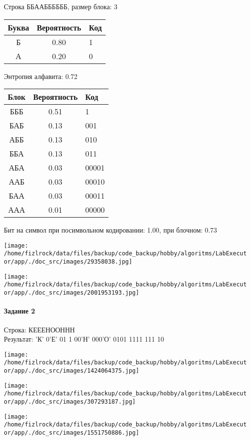 \documentclass[a4paper, 12pt]{article}
\begin{document}
Строка ББААББББББ, размер блока: 3
\begin{center}
 \begin{tabular}{ |c|c|l| } 
  \hline
     Буква & Вероятность & Код\\ \hline
Б & 0.80 & 1\\\hline
А & 0.20 & 0
\\ \hline \end{tabular}
\end{center}
Энтропия алфавита: 0.72
\begin{center}
 \begin{tabular}{ |c|c|l| } 
  \hline
     Блок & Вероятность & Код\\ \hline
БББ & 0.51 & 1\\\hline
БАБ & 0.13 & 001\\\hline
АББ & 0.13 & 010\\\hline
ББА & 0.13 & 011\\\hline
АБА & 0.03 & 00001\\\hline
ААБ & 0.03 & 00010\\\hline
БАА & 0.03 & 00011\\\hline
ААА & 0.01 & 00000
\\ \hline \end{tabular}
\end{center}
Бит на символ при посимвольном кодировании: 1.00, при блочном: 0.73

\texttt{[image: /home/fizlrock/data/files/backup/code\_backup/hobby/algoritms/LabExecutor/app/./doc\_src/images/29358038.jpg]}

\texttt{[image: /home/fizlrock/data/files/backup/code\_backup/hobby/algoritms/LabExecutor/app/./doc\_src/images/2001953193.jpg]}
\pagebreak
\paragraph{Задание 2}

Строка: 
КЕЕЕНООННН\\
Результат: 'К' 0'Е' 01 1 00'Н' 000'О' 0101 1111 111 10

\texttt{[image: /home/fizlrock/data/files/backup/code\_backup/hobby/algoritms/LabExecutor/app/./doc\_src/images/1424064375.jpg]}

\texttt{[image: /home/fizlrock/data/files/backup/code\_backup/hobby/algoritms/LabExecutor/app/./doc\_src/images/307293187.jpg]}

\texttt{[image: /home/fizlrock/data/files/backup/code\_backup/hobby/algoritms/LabExecutor/app/./doc\_src/images/1551750886.jpg]}
\end{document}
